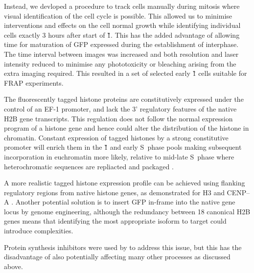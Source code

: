     Instead, we devloped a procedure to track cells manually during mitosis 
    where visual identification of the cell cycle is possible. 
    This allowed us to minimise interventions and effects on the cell normal growth
    while identifying individual cells exactly 3 hours after start of \G1{}.
    This has the added advantage of allowing time for maturation of GFP 
    expressed during the establishment of interphase.
    The time interval between images was increased and 
    both resolution and laser intensity reduced
    to minimise any phototoxicity or bleaching arising from the extra imaging required.
    This resulted in a set of selected early \G1{} cells suitable for FRAP experiments.

    The fluorescently tagged histone proteins are constitutively expressed 
    under the control of an EF-1\textalpha{} promoter, 
    and lack the 3' regulatory features of the native H2B gene transcripts.
    This regulation does not follow the normal expression program of a histone gene 
    and hence could alter the distribution of the histone in chromatin.
    Constant expression of tagged histones by a strong constitutive promoter
    will enrich them in the \G1{} and early S~phase pools
    making subsequent incorporation in euchromatin more likely,
    relative to mid-late S~phase where heterochromatic sequences are repliacted and packaged \citep{DNA-replication-timing}.

    A more realistic tagged histone expression profile can be achieved using 
    flanking regulatory regions from native histone genes,
    as demonstrated for H3 and CENP--A \citep{pMH3-plasmid,Kevin-pCA-TAG}.
    Another potential solution is to insert GFP in-frame into the native gene locus by genome engineering,
    although the redundancy between 18 canonical H2B genes means
    that identifying the most appropriate isoform to target could introduce complexities.

    Protein synthesis inhibitors were used by \cite{KimuraCook} to address this issue,
    but this has the disadvantage of also potentially affecting many other processes as discussed above.


